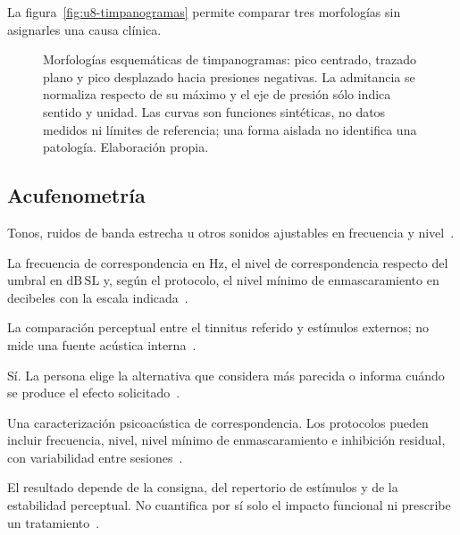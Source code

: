 La figura~\ref{fig:u8-timpanogramas} permite comparar tres morfologías sin
asignarles una causa clínica.

\begin{figure}[htbp]
    \centering
    \resizebox{\textwidth}{!}{%
    }
    \caption{Morfologías esquemáticas de timpanogramas: pico centrado, trazado
    plano y pico desplazado hacia presiones negativas. La admitancia se
    normaliza respecto de su máximo y el eje de presión sólo indica sentido y
    unidad. Las curvas son funciones sintéticas, no datos medidos ni límites
    de referencia; una forma aislada no identifica una patología. Elaboración
    propia.}
    \label{fig:u8-timpanogramas}
    \label{fig:timpanometria}
\end{figure}

\subsection{Acufenometría}
\label{sec:u8-acufenometria}

\begin{description}[style=nextline]
    \item[Estímulo.]
    Tonos, ruidos de banda estrecha u otros sonidos ajustables en
    frecuencia y nivel~\cite{ashaTinnitus}.

    \item[Magnitud registrada.]
    La frecuencia de correspondencia en \(\mathrm{Hz}\), el nivel de
    correspondencia respecto del umbral en \(\mathrm{dB\,SL}\) y, según el
    protocolo, el nivel mínimo de enmascaramiento en decibeles con la escala
    indicada~\cite{ashaTinnitus}.

    \item[Parte del sistema evaluada.]
    La comparación perceptual entre el tinnitus referido y estímulos
    externos; no mide una fuente acústica interna~\cite{ashaTinnitus}.

    \item[Respuesta conductual.]
    Sí. La persona elige la alternativa que considera más parecida o
    informa cuándo se produce el efecto solicitado~\cite{ashaTinnitus}.

    \item[Resultado básico esperado.]
    Una caracterización psicoacústica de correspondencia. Los
    protocolos pueden incluir frecuencia, nivel, nivel mínimo de
    enmascaramiento e inhibición residual, con variabilidad entre sesiones~\cite{ashaTinnitus}.

    \item[Limitaciones generales.]
    El resultado depende de la consigna, del repertorio de estímulos y de la
    estabilidad perceptual. No cuantifica por sí solo el impacto funcional ni
    prescribe un tratamiento~\cite{ashaTinnitus}.
\end{description}

